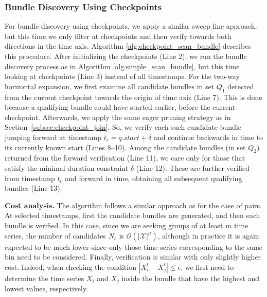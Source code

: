 \subsubsection{Bundle Discovery Using Checkpoints}
\label{sec:checkpoint_bundle}
For bundle discovery using checkpoints, we apply a similar sweep line approach, but this time we only filter at checkpoints and then verify towards both directions in the time axis. Algorithm \ref{alg:checkpoint_scan_bundle} describes this procedure. After initializing the checkpoints (Line 2), we run the bundle discovery process as in Algorithm \ref{alg:simple_scan_bundle}, but this time looking at checkpoints (Line 3) instead of all timestamps. For the two-way horizontal expansion, we first examine all candidate bundles in set $Q_1$ detected from the current checkpoint towards the origin of time axis (Line 7). This is done because a qualifying bundle could have started earlier, before the current checkpoint. Afterwards, we apply the same eager pruning strategy as in Section~\ref{subsec:checkpoint_join}. So, we verify each such candidate bundle jumping forward at timestamp $t_c = q.start + \delta$ and continue backwards in time to its currently known start (Lines 8--10). Among the candidate bundles (in set $Q_2$) returned from the forward verification (Line 11), we care only for those that satisfy the minimal duration constraint $\delta$ (Line 12). These are further verified from timestamp $t_c$ and forward in time, obtaining all subsequent qualifying bundles (Line 13).


\textbf{Cost analysis.} The algorithm follows a similar approach as for the case of pairs. At selected timestamps, first the candidate bundles are generated, and then each bundle is verified. In this case, since we are seeking groups of at least $m$ time series, the number of candidates $N_c$ is $\mathcal{O}(|\mathcal{X}|^{\mu})$, although in practice it is again expected to be much lower since only those time series corresponding to the same bin need to be considered. Finally, verification is similar with only slightly higher cost. Indeed, when checking the condition $|X_i^{t} - X_j^{t}| \leq \epsilon$, we first need to determine the time series $X_i$ and $X_j$ inside the bundle that have the highest and lowest values, respectively.